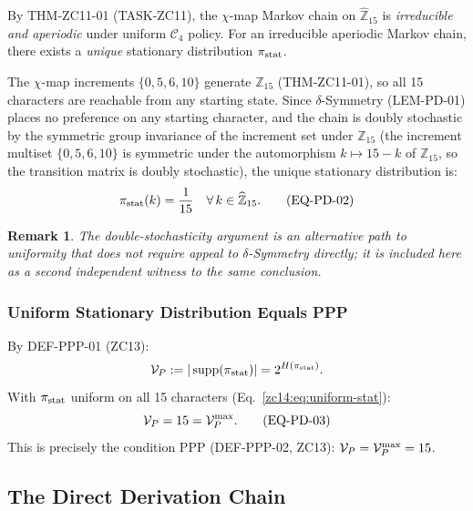 \documentclass[12pt, a4paper]{article}
\newtheorem{remark}{Remark}[section]
\begin{document}
\begin{derivedbox}[title={$\pi_\delta$ Propagates through the
  $\chi$-Map Dynamics}]
By THM-ZC11-01 (TASK-ZC11), the $\chi$-map Markov chain on
$\widehat{\mathbb{Z}}_{15}$ is \emph{irreducible and aperiodic}
under uniform $\mathcal{C}_4$ policy. For an irreducible
aperiodic Markov chain, there exists a \emph{unique} stationary
distribution $\pi_{\rm stat}$.

The $\chi$-map increments $\{0, 5, 6, 10\}$ generate
$\mathbb{Z}_{15}$ (THM-ZC11-01), so all 15 characters are
reachable from any starting state. Since $\delta$-Symmetry
(LEM-PD-01) places no preference on any starting character,
and the chain is doubly stochastic by the symmetric group
invariance of the increment set under $\mathbb{Z}_{15}$
(the increment multiset $\{0,5,6,10\}$ is symmetric under
the automorphism $k \mapsto 15-k$ of $\mathbb{Z}_{15}$,
so the transition matrix is doubly stochastic), the unique
stationary distribution is:
\[
  \pi_{\rm stat}(k) = \frac{1}{15}
  \quad \forall\, k \in \widehat{\mathbb{Z}}_{15}.
  \tag{EQ-PD-02}\label{zc14:eq:uniform-stat}
\]
\end{derivedbox}

\begin{remark}
The double-stochasticity argument is an alternative path to
uniformity that does not require appeal to $\delta$-Symmetry
directly; it is included here as a second independent witness
to the same conclusion.
\end{remark}

\subsubsection{Uniform Stationary Distribution Equals PPP}
\label{zc14:sec:ppp-follows}

By DEF-PPP-01 (ZC13):
\[
  \mathcal{V}_P := |\operatorname{supp}(\pi_{\rm stat})|
  = 2^{H(\pi_{\rm stat})}.
\]
With $\pi_{\rm stat}$ uniform on all 15 characters
(Eq.~\eqref{zc14:eq:uniform-stat}):
\[
  \mathcal{V}_P = 15 = \mathcal{V}_P^{\rm max}.
  \tag{EQ-PD-03}\label{zc14:eq:Vp-max}
\]
This is precisely the condition PPP (DEF-PPP-02, ZC13):
$\mathcal{V}_P = \mathcal{V}_P^{\rm max} = 15$.

\subsection{The Direct Derivation Chain}
\label{zc14:sec:chain}
\end{document}
